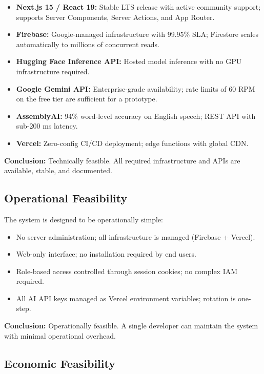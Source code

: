 \documentclass[12pt,a4paper,oneside]{report}
\begin{document}
\begin{itemize}
  \item \textbf{Next.js 15 / React 19:} Stable LTS release with active community support; supports Server Components, Server Actions, and App Router.
  \item \textbf{Firebase:} Google-managed infrastructure with 99.95\% SLA; Firestore scales automatically to millions of concurrent reads.
  \item \textbf{Hugging Face Inference API:} Hosted model inference with no GPU infrastructure required.
  \item \textbf{Google Gemini API:} Enterprise-grade availability; rate limits of 60 RPM on the free tier are sufficient for a prototype.
  \item \textbf{AssemblyAI:} 94\% word-level accuracy on English speech; REST API with sub-200 ms latency.
  \item \textbf{Vercel:} Zero-config CI/CD deployment; edge functions with global CDN.
\end{itemize}

\textbf{Conclusion:} Technically feasible. All required infrastructure and APIs are available, stable, and documented.

\subsection{Operational Feasibility}

The system is designed to be operationally simple:
\begin{itemize}
  \item No server administration; all infrastructure is managed (Firebase + Vercel).
  \item Web-only interface; no installation required by end users.
  \item Role-based access controlled through session cookies; no complex IAM required.
  \item All AI API keys managed as Vercel environment variables; rotation is one-step.
\end{itemize}

\textbf{Conclusion:} Operationally feasible. A single developer can maintain the system with minimal operational overhead.

\subsection{Economic Feasibility}
\end{document}
